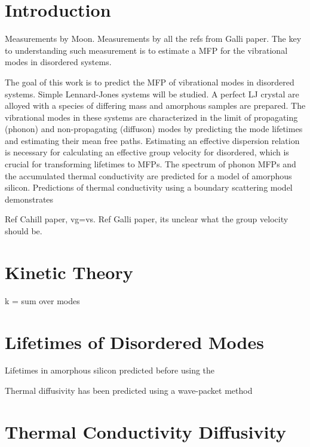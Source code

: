 \documentclass[aps,prb,preprint,superscriptaddress,amsmath,amssymb,floatfix]{revtex4}
\begin{document}
\section{\label{S:Introduction}Introduction}
Measurements by Moon.  Measurements by all the refs from Galli paper.  The 
key to understanding such measurement is to estimate a MFP for the 
vibrational modes in disordered systems. 


The goal of this work is to predict the MFP of vibrational modes in 
disordered systems. Simple Lennard-Jones systems will be studied.  A 
perfect LJ crystal are alloyed with a species of differing mass and 
amorphous samples are prepared. The vibrational modes in these systems are
characterized in the limit of propagating (phonon) and 
non-propagating (diffuson) modes by predicting the mode lifetimes and 
estimating their mean free paths. Estimating an effective dispersion
relation is necessary for calculating an effective group velocity for 
disordered, which is crucial for transforming lifetimes to MFPs.
The spectrum of phonon MFPs and the accumulated thermal conductivity 
are predicted for a model of amorphous silicon. Predictions of thermal 
conductivity using a boundary scattering model demonstrates  

Ref Cahill paper, vg=vs. Ref Galli paper, its unclear what the group 
velocity should be.\cite{he_heat_2011}

\section{\label{S:Lifetimes}Kinetic Theory}

k = sum over modes

\section{\label{S:Lifetimes}Lifetimes of Disordered Modes}

Lifetimes in amorphous silicon predicted before using the
 \cite{bickham_calculation_1998}

Thermal diffusivity has been predicted using a wave-packet method

\section{\label{S:Lifetimes}Thermal Conductivity Diffusivity}
\end{document}
